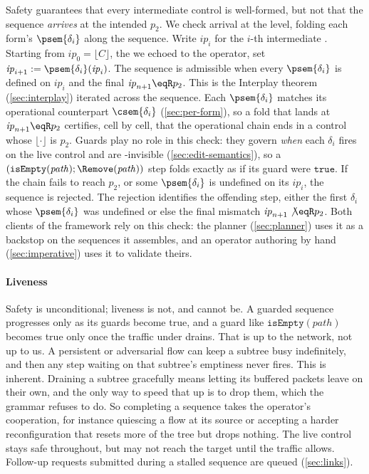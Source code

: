 Safety guarantees that every intermediate control is well-formed, but not that the sequence \emph{arrives} at the intended \(p_2\).
We check arrival at the \pol level, folding each form's \(\psem{\delta_i}\) along the sequence.
Write \(\mathit{ip}_i\) for the \(i\)-th intermediate \pol.
Starting from \(\mathit{ip}_0 = \lfloor C \rfloor\), the \pol we echoed to the operator, set \(\mathit{ip}_{i+1} := \psem{\delta_i}(\mathit{ip}_i)\).
The sequence is admissible when every \(\psem{\delta_i}\) is defined on \(\mathit{ip}_i\) and the final \(\mathit{ip}_{n+1} \eqR p_2\).
This is the Interplay theorem (\cref{sec:interplay}) iterated across the sequence.
Each \(\psem{\delta_i}\) matches its operational counterpart \(\csem{\delta_i}\) (\cref{sec:per-form}), so a fold that lands at \(\mathit{ip}_{n+1} \eqR p_2\) certifies, cell by cell, that the operational chain ends in a control whose \(\lfloor \cdot \rfloor\) is \(p_2\).
Guards play no role in this check: they govern \emph{when} each \(\delta_i\) fires on the live control and are \pol-invisible (\cref{sec:edit-semantics}), so a \((\mathtt{isEmpty}(\mathit{path}); \Remove(\mathit{path}))\) step folds exactly as if its guard were \(\mathtt{true}\).
If the chain fails to reach \(p_2\), or some \(\psem{\delta_i}\) is undefined on its \(\mathit{ip}_i\), the sequence is rejected.
The rejection identifies the offending step, either the first \(\delta_i\) whose \(\psem{\delta_i}\) was undefined or else the final mismatch \(\mathit{ip}_{n+1} \not\eqR p_2\).
Both clients of the framework rely on this check: the planner (\cref{sec:planner}) uses it as a backstop on the sequences it assembles, and an operator authoring by hand (\cref{sec:imperative}) uses it to validate theirs.

\paragraph{Liveness}

Safety is unconditional; liveness is not, and cannot be.
A guarded sequence progresses only as its guards become true, and a guard like \(\mathtt{isEmpty}(\mathit{path})\) becomes true only once the traffic under \pth drains.
That is up to the network, not up to us.
A persistent or adversarial flow can keep a subtree busy indefinitely, and then any step waiting on that subtree's emptiness never fires.
This is inherent.
Draining a subtree gracefully means letting its buffered packets leave on their own, and the only way to speed that up is to drop them, which the grammar refuses to do.
So completing a sequence takes the operator's cooperation, for instance quiescing a flow at its source or accepting a harder reconfiguration that resets more of the tree but drops nothing.
The live control stays safe throughout, but may not reach the target \pol until the traffic allows.
Follow-up requests submitted during a stalled sequence are queued (\cref{sec:links}).

